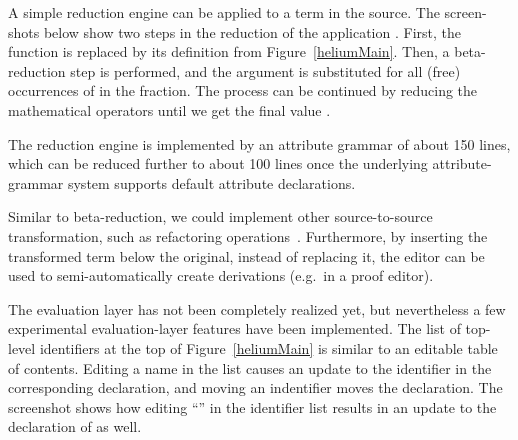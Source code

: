 

%


A simple reduction engine can be applied to a term in the source. The screen-shots below show two steps in the reduction of the application . First, the function  is replaced by its definition from Figure~\ref{heliumMain}. Then, a beta-reduction step is performed, and the argument  is substituted for all (free) occurrences of  in the fraction. The process can be continued by reducing the mathematical operators until we get the final value .

 \then
{} \then
{}


The reduction engine is implemented by an attribute grammar of about 150 lines, which can be reduced further to about 100 lines once the underlying attribute-grammar system supports default attribute declarations.

Similar to beta-reduction, we could implement other source-to-source transformation, such as refactoring operations~\cite{reinke03refactoring}. Furthermore, by inserting the transformed term below the original, instead of replacing it, the editor can be used to semi-automatically create derivations (e.g.\ in a proof editor).




The evaluation layer has not been completely realized yet, but nevertheless a few experimental evaluation-layer features have been implemented. The list of top-level identifiers at the top of Figure~\ref{heliumMain} is similar to an editable table of contents. Editing a name in the list causes an update to the identifier in the corresponding declaration, and moving an indentifier moves the declaration. The screenshot shows how editing ``'' in the identifier list results in an update to the declaration of  as well.


